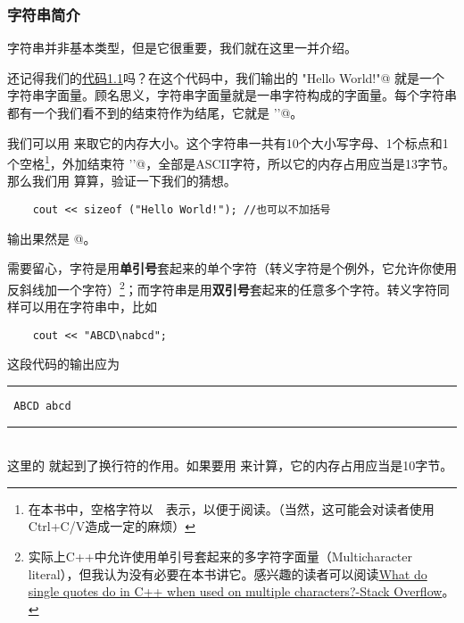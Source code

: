 \subsubsection*{字符串简介}
字符串并非基本类型，但是它很重要，我们就在这里一并介绍。\par
还记得我们的\hyperref[lst:HelloWorld]{代码1.1}吗？在这个代码中，我们输出的 \lstinline@"Hello World!"@ 就是一个字符串字面量。顾名思义，字符串字面量就是一串字符构成的字面量。每个字符串都有一个我们看不到的结束符作为结尾，它就是 \lstinline@'\0'@。\par
我们可以用 \lstinline@sizeof@ 来取它的内存大小。这个字符串一共有10个大小写字母、1个标点和1个空格\footnote{在本书中，空格字符以\ {\color{red}\textvisiblespace}\ 表示，以便于阅读。（当然，这可能会对读者使用Ctrl+C/V造成一定的麻烦）}，外加结束符 \lstinline@'\0'@，全部是ASCII字符，所以它的内存占用应当是13字节。
那么我们用 \lstinline@sizeof@ 算算，验证一下我们的猜想。
\begin{lstlisting}
    cout << sizeof ("Hello World!"); //也可以不加括号
\end{lstlisting}
输出果然是 @。\par
需要留心，字符是用\textbf{单引号}套起来的单个字符（转义字符是个例外，它允许你使用反斜线加一个字符）\footnote{实际上C++中允许使用单引号套起来的多字符字面量（Multicharacter literal），但我认为没有必要在本书讲它。感兴趣的读者可以阅读\href{https://stackoverflow.com/questions/7459939/what-do-single-quotes-do-in-c-when-used-on-multiple-characters}{What do single quotes do in C++ when used on multiple characters?-Stack Overflow}。}；而字符串是用\textbf{双引号}套起来的任意多个字符。转义字符同样可以用在字符串中，比如
\begin{lstlisting}
    cout << "ABCD\nabcd";
\end{lstlisting}
这段代码的输出应为\\\noindent\rule{\textwidth}{0.2pt}\texttt{
ABCD
abcd
}\\\noindent\rule{\textwidth}{0.2pt}\\
这里的 \lstinline@\n@ 就起到了换行符的作用。如果要用 \lstinline@sizeof@ 来计算，它的内存占用应当是10字节。\par
